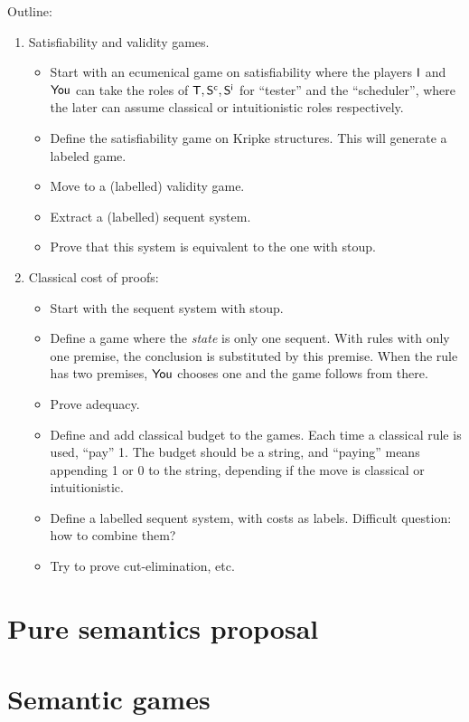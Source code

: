 \documentclass[a4paper,UKenglish,cleveref, autoref, thm-restate]{lipics-v2021}
\begin{document}
Outline:
\begin{enumerate}
\item Satisfiability and validity games.
\begin{itemize}
\item Start with an ecumenical game on satisfiability where the players $\mathsf{I}$ and $\mathsf{You}$ can take the roles of $\mathsf{T}, \mathsf{S^c},\mathsf{S^i}$ for ``tester'' and the ``scheduler'', where the later can assume classical or intuitionistic roles respectively. 
\item Define the satisfiability game on Kripke structures. This will generate a labeled game.
\item Move to a (labelled) validity game.
\item Extract a (labelled) sequent system. 
\item Prove that this system is equivalent to the one with stoup.
\end{itemize}
\item Classical cost of proofs:
\begin{itemize}
\item Start with the sequent system with stoup. 
\item Define a game where the {\em state} is only one sequent. With rules with only one premise, the conclusion is substituted by this premise. When the rule has two premises, $\mathsf{You}$ chooses one and the game follows from there.
\item Prove adequacy.
\item Define and add classical budget to the games. Each time a classical rule is used, ``pay'' 1. The budget should be a string, and ``paying'' means appending 1 or 0 to the string, depending if the move is classical or intuitionistic. 
\item Define a labelled sequent system, with costs as labels. Difficult question: how to combine them?
\item Try to prove cut-elimination, etc.
\end{itemize}
\end{enumerate}


\section{Pure semantics proposal}\label{sec:pure-semantics}


\section{Semantic games}\label{sec:semantic-games}




 
\end{document}
